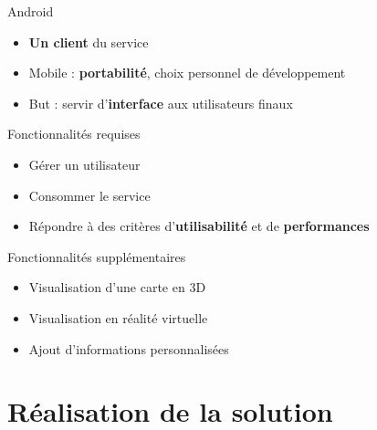 \documentclass{beamer} %
\begin{document}
  \begin{frame}{\subsecname}
    \begin{block}{Android}
      \begin{itemize}
        \item \textbf{Un client} du service
        \item Mobile : \textbf{portabilité}, choix personnel de développement
        \item But : servir d'\textbf{interface} aux utilisateurs finaux
      \end{itemize}
    \end{block}

    \pause

    \begin{alertblock}{Fonctionnalités requises}
      \begin{itemize}
        \item Gérer un utilisateur
        \item Consommer le service
        \item Répondre à des critères d'\textbf{utilisabilité} et de \textbf{performances}
      \end{itemize}
    \end{alertblock}

    \pause

    \begin{exampleblock}{Fonctionnalités supplémentaires}
      \begin{itemize}
        \item Visualisation d'une carte en 3D
        \item Visualisation en réalité virtuelle
        \item Ajout d'informations personnalisées
      \end{itemize}
    \end{exampleblock}

  \end{frame}


  \section{Réalisation de la solution}
\end{document}
